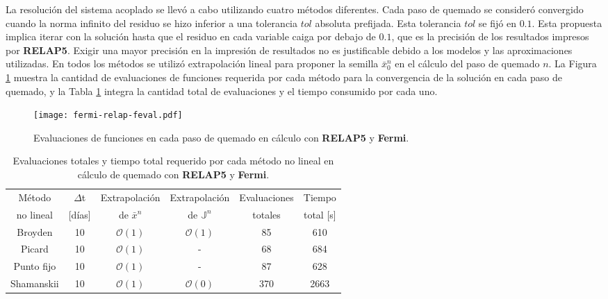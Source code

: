 La resolución del sistema acoplado se llevó a cabo utilizando cuatro métodos diferentes.
Cada paso de quemado se consideró convergido cuando la norma infinito del residuo se hizo inferior a una tolerancia $tol$ absoluta prefijada.
Esta tolerancia $tol$ se fijó en $0.1$.
Esta propuesta implica iterar con la solución hasta que el residuo en cada variable caiga por debajo de $0.1$, que es la precisión de los resultados impresos por \textbf{RELAP5}.
Exigir una mayor precisión en la impresión de resultados no es justificable debido a los modelos y las aproximaciones utilizadas.
En todos los métodos se utilizó extrapolación lineal para proponer la semilla $\bar{x}_0^n$ en el cálculo del paso de quemado $n$.
La Figura \ref{figura-relap-fermi} muestra la cantidad de evaluaciones de funciones requerida por cada método para la convergencia de la solución en cada paso de quemado,
y la Tabla \ref{tabla-relap-fermi} integra la cantidad total de evaluaciones y el tiempo consumido por cada uno.

\begin{figure}[h]
  \centering
  \texttt{[image: fermi-relap-feval.pdf]}  
  \caption[Evaluaciones de funciones en cada paso de quemado en cálculo con \textbf{RELAP5} y \textbf{Fermi}]
  {Evaluaciones de funciones en cada paso de quemado en cálculo con \textbf{RELAP5} y \textbf{Fermi}.}
  \label{figura-relap-fermi}
\end{figure}

\begin{table}[h]
  \centering
  \begin{tabular}{c c c c cc } \hline
      \multicolumn{1}{c}{Método} & \multirow{1}{*}{$\Delta$t} & \multicolumn{1}{c}{Extrapolación} & \multicolumn{1}{c}{Extrapolación}  & \multicolumn{1}{c}{Evaluaciones} & \multicolumn{1}{c}{Tiempo} \\ %
      \multicolumn{1}{c}{no lineal} & [días] & \multicolumn{1}{c}{de $\bar{x}^n$} & \multicolumn{1}{c}{de $\mathbb{J}^n$} & \multicolumn{1}{c}{totales} & \multicolumn{1}{c}{total [s]}\\ \hline %
      Broyden & 10 & $\mathscr{O}(1)$ & $\mathscr{O}(1)$ & 85 & 610 \\ %
      Picard & 10 & $\mathscr{O}(1)$ & - & 68 & 684 \\ %
      Punto fijo & 10 & $\mathscr{O}(1)$ & - & 87 & 628  \\ %
      Shamanskii & 10 & $\mathscr{O}(1)$ & $\mathscr{O}(0)$& 370 & 2663  \\ \hline
   \end{tabular}   
   \caption[Evaluaciones totales y tiempo total requerido por cada método no lineal en cálculo de quemado con \textbf{RELAP5} y \textbf{Fermi}]
   {Evaluaciones totales y tiempo total requerido por cada método no lineal en cálculo de quemado con \textbf{RELAP5} y \textbf{Fermi}.}
   \label{tabla-relap-fermi}
\end{table}

